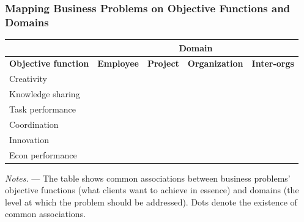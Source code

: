 \documentclass[notes, aspectratio=1610]{beamer}
\begin{document}
\begin{frame}
	\frametitle{Mapping Business Problems on Objective Functions and Domains}

	\begin{table}
		\begin{small}
			\begin{center}
				\begin{tabular}[c]{
					p{3cm}|p{2.1cm}|p{2.1cm}|p{2.1cm}|p{2.1cm}
					}
					\multicolumn{1}{c}{\textbf{}}
					& \multicolumn{4}{c}{\textbf{Domain}}\\
					\hline
					\textbf{Objective function}
					&\multicolumn{1}{c|}{\textbf{Employee}}
					&\multicolumn{1}{c|}{\textbf{Project}}
					&\multicolumn{1}{c|}{\textbf{Organization}}
					&\multicolumn{1}{c}{\textbf{Inter-orgs}}\\
					\hline
					Creativity\dotfill&
					\cellcolor{white!25}\multicolumn{1}{c}{\bullet}& 
					\cellcolor{white!25}\multicolumn{1}{c}{\bullet}&
					&
					\\ 
					Knowledge sharing\dotfill&
					\cellcolor{white!25}\multicolumn{1}{c}{\bullet}&
					\cellcolor{white!25}\multicolumn{1}{c}{\bullet}&
					&
					\\
					Task performance\dotfill&
					\cellcolor{white!25}\multicolumn{1}{c}{\bullet}&
					\cellcolor{white!25}\multicolumn{1}{c}{\bullet}&
					&
					\\ 
					Coordination\dotfill&
					\cellcolor{white!25}\multicolumn{1}{c}{\bullet}&
					\cellcolor{white!25}\multicolumn{1}{c}{\bullet}&
					\cellcolor{white!25}\multicolumn{1}{c}{\bullet}&
					\cellcolor{white!25}\multicolumn{1}{c}{\bullet}\\
					Innovation\dotfill&
					\cellcolor{white!25}\multicolumn{1}{c}{\bullet}&
					\cellcolor{white!25}\multicolumn{1}{c}{\bullet}&
					\cellcolor{white!25}\multicolumn{1}{c}{\bullet}&
					\cellcolor{white!25}\multicolumn{1}{c}{\bullet}\\ 
				        Econ performance\dotfill&
					&
					&\cellcolor{white!25}\multicolumn{1}{c}{\bullet}
					&
					\\
				\end{tabular}
			\end{center}
		\end{small}
	\end{table}
	\textit{Notes.} --- The table shows common associations between business problems' 
	objective functions (what clients want to achieve in essence) 
	and domains (the level at which the problem should be addressed). Dots 
	denote the existence of common associations.
\end{frame}
\end{document}
